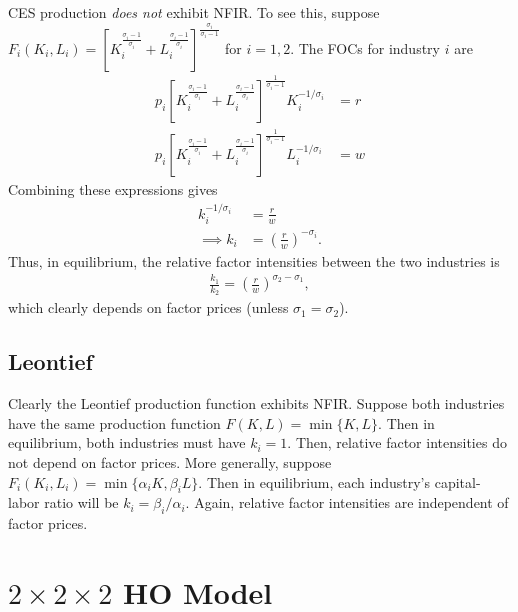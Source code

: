 \documentclass[12pt]{article}
\begin{document}
CES production \textit{does not} exhibit NFIR. To see this, suppose $F_i(K_i,L_i) = \left[K_i^{\frac{\sigma_i - 1}{\sigma_i}} + L_i^{\frac{\sigma_i - 1}{\sigma_i}}\right]^{\frac{\sigma_i}{\sigma_i - 1}}$ for $i = 1,2$. The FOCs for industry $i$ are
\begin{align}
p_i\left[K_i^{\frac{\sigma_i - 1}{\sigma_i}} + L_i^{\frac{\sigma_i - 1}{\sigma_i}}\right]^{\frac{1}{\sigma_i - 1}}K_i^{-1/\sigma_i} &= r \label{eq:ces1}\\
p_i\left[K_i^{\frac{\sigma_i - 1}{\sigma_i}} + L_i^{\frac{\sigma_i - 1}{\sigma_i}}\right]^{\frac{1}{\sigma_i - 1}}L_i^{-1/\sigma_i} &= w \label{eq:ces1}
\end{align}
Combining these expressions gives
\begin{align*}
k_i^{-1/\sigma_i} &= \frac{r}{w}\\
\implies k_i &= \left(\frac{r}{w}\right)^{-\sigma_i}.
\end{align*}
Thus, in equilibrium, the relative factor intensities between the two industries is
\begin{align*}
\frac{k_1}{k_2} = \left(\frac{r}{w}\right)^{\sigma_2-\sigma_1},
\end{align*}
which clearly depends on factor prices (unless $\sigma_1 = \sigma_2$).\\

\subsection{Leontief}

Clearly the Leontief production function exhibits NFIR. Suppose both industries have the same production function $F(K,L) = \min\{K,L\}$. Then in equilibrium, both industries must have $k_i = 1$. Then, relative factor intensities do not depend on factor prices. More generally, suppose $F_i(K_i,L_i) = \min\{\alpha_iK,\beta_iL\}$. Then in equilibrium, each industry's capital-labor ratio will be $k_i = \beta_i/\alpha_i$. Again, relative factor intensities are independent of factor prices.

\newpage

\section{$2 \times 2 \times 2$ HO Model}
\end{document}
